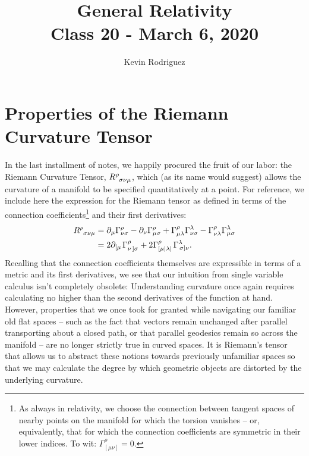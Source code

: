 \documentclass[10pt]{article}
\title{{\Huge General Relativity}\\{\Large{Class  20 - March 6, 2020}}} %
\author{Kevin Rodriguez}
\begin{document}
    \maketitle
    \flushbottom
    \newpage
    \pagestyle{fancynotes}
	\section{Properties of the Riemann Curvature Tensor}	\label{sec:properties}
    In the last installment of notes, we happily procured the fruit of our labor: the Riemann Curvature Tensor, $\tensor{R}{^\rho_\sigma _\nu _\mu}$, which (as its name would suggest) allows the curvature of a manifold to be specified quantitatively at a point. For reference, we include here the expression for the Riemann tensor as defined in terms of the connection coefficients\footnote{As always in relativity, we choose the connection between tangent spaces of nearby points on the manifold for which the torsion vanishes -- or, equivalently, that for which the connection coefficients are symmetric in their lower indices. To wit: $\Gamma^{\rho}_{[\mu\nu]}=0$.} and their first derivatives:
    \begin{align}
        \tensor{R}{^\rho_\sigma _\nu _\mu} &= \partial_{\mu}\Gamma^{\rho}_{\nu\sigma} - \partial_\nu\Gamma^{\rho}_{\mu\sigma} + \Gamma^{\rho}_{\mu\lambda}\Gamma^{\lambda}_{\nu\sigma} - \Gamma^{\rho}_{\nu\lambda}\Gamma^{\lambda}_{\mu\sigma}	\label{eq:riemann}\\
        &= 2 \partial_{\left[\mu\right.}\Gamma^{\rho}_{\nu\left.\right]\sigma} + 2 \Gamma^{\rho}_{\left[\mu|\lambda|\right.}\Gamma^{\lambda}_{\left.\sigma\right]\nu} . \notag
    \end{align}
    Recalling that the connection coefficients themselves are expressible in terms of a metric and its first derivatives, we see that our intuition from single variable calculus isn't completely obsolete: Understanding curvature once again requires calculating no higher than the second derivatives of the function at hand. However, properties that we once took for granted while navigating our familiar old flat spaces -- such as the fact that vectors remain unchanged after parallel transporting about a closed path, or that parallel geodesics remain so across the manifold -- are no longer strictly true in curved spaces. It is Riemann's tensor that allows us to abstract these notions towards previously unfamiliar spaces so that we may calculate the degree by which geometric objects are distorted by the underlying curvature. \\
\end{document}
